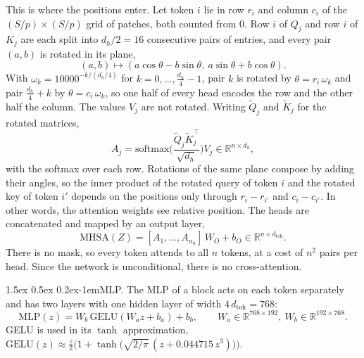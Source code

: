 \documentclass{article}
\makeatletter
\renewcommand{\normalsize}{\fontsize{10pt}{11pt}\selectfont}
\renewcommand{\paragraph}{\@startsection{paragraph}{4}{\z@}%
  {1.5ex \@plus 0.5ex \@minus 0.2ex}{-1em}{\normalsize\bfseries}}
\theoremstyle{remark}
\newcommand{\R}{\mathbb{R}}
\makeatother
\begin{document}
This is where the positions enter. Let token $i$ lie in row $r_i$ and column $c_i$ of the $(S/p) \times (S/p)$ grid of patches, both counted from $0$. Row $i$ of $Q_j$ and row $i$ of $K_j$ are each split into $d_h/2 = 16$ consecutive pairs of entries, and every pair $(a,b)$ is rotated in its plane,
$$
  (a,b) \mapsto (a\cos\theta - b\sin\theta,\ a\sin\theta + b\cos\theta).
$$
With $\omega_k = 10000^{-k/(d_h/4)}$ for $k = 0,\dots,\frac{d_h}{4} - 1$, pair $k$ is rotated by $\theta = r_i\,\omega_k$ and pair $\frac{d_h}{4} + k$ by $\theta = c_i\,\omega_k$, so one half of every head encodes the row and the other half the column. The values $V_j$ are not rotated. Writing $\tilde Q_j$ and $\tilde K_j$ for the rotated matrices,
$$
  A_j = \mathrm{softmax}\Big(\frac{\tilde Q_j\tilde K_j^\top}{\sqrt{d_h}}\Big)V_j \in \R^{n \times d_h},
$$
with the softmax over each row. Rotations of the same plane compose by adding their angles, so the inner product of the rotated query of token $i$ and the rotated key of token $i'$ depends on the positions only through $r_i - r_{i'}$ and $c_i - c_{i'}$. In other words, the attention weights see relative position. The heads are concatenated and mapped by an output layer,
$$
  \mathrm{MHSA}(Z) = [A_1,\dots,A_{n_h}]\,W_O + b_O \in \R^{n \times d_{\mathrm{tok}}}.
$$
There is no mask, so every token attends to all $n$ tokens, at a cost of $n^2$ pairs per head. Since the network is unconditional, there is no cross-attention.

\paragraph{MLP.} The MLP of a block acts on each token separately and has two layers with one hidden layer of width $4\,d_{\mathrm{tok}} = 768$:
$$
  \mathrm{MLP}(z) = W_b\,\mathrm{GELU}(W_a z + b_a) + b_b,\qquad W_a \in \R^{768 \times 192},\ W_b \in \R^{192 \times 768}.
$$
GELU \citep{hendrycks2016gelu} is used in its $\tanh$ approximation, $\mathrm{GELU}(z) \approx \frac z2\big(1 + \tanh\big(\sqrt{2/\pi}\,(z + 0.044715\,z^3)\big)\big)$.
\end{document}
